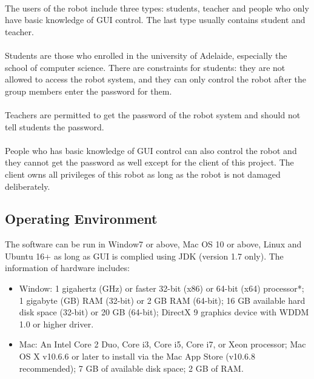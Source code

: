 \documentclass[10pt,a4paper,titlepage]{article}
\begin{document}
	\paragraph{}
The users of the robot include three types: students, teacher and people who only have basic knowledge of GUI control. The last type usually contains student and teacher.
	\paragraph{}
Students are those who enrolled in the university of Adelaide, especially the school of computer science. There are constraints for students: they are not allowed to access the robot system, and they can only control the robot after the group members enter the password for them.
	\paragraph{}
Teachers are permitted to get the password of the robot system and should not tell students the password. 
	\paragraph{}
People who has basic knowledge of GUI control can also control the robot and they cannot get the password as well except for the client of this project. The client owns all privileges of this robot as long as the robot is not damaged deliberately.

	\subsection{Operating Environment}
The software can be run in Window7 or above, Mac OS 10 or above, Linux and Ubuntu 16+ as long as GUI is complied using JDK (version 1.7 only). The information of hardware includes:
	\begin{itemize}
	\item Window: 1 gigahertz (GHz) or faster 32-bit (x86) or 64-bit (x64) processor*;
   1 gigabyte (GB) RAM (32-bit) or 2 GB RAM (64-bit);
	   16 GB available hard disk space (32-bit) or 20 GB (64-bit);
	   DirectX 9 graphics device with WDDM 1.0 or higher driver.
	\item Mac: An Intel Core 2 Duo, Core i3, Core i5, Core i7, or Xeon processor;
         Mac OS X v10.6.6 or later to install via the Mac App Store (v10.6.8 recommended);
         7 GB of available disk space;
         2 GB of RAM.
	\end{itemize}
\end{document}
